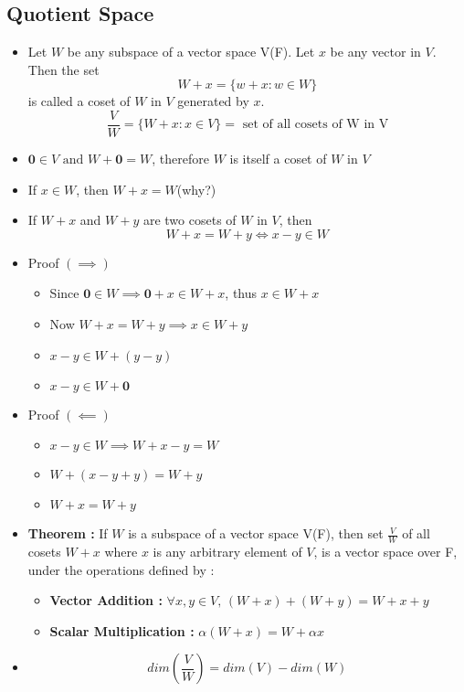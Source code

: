 \documentclass[twoside]{article}
\begin{document}
	\subsection{Quotient Space}
	\begin{itemize}
		\item Let $W$ be any subspace of a vector space V(F). Let $x$ be any vector in $V$. Then the set 
		\[W + x = \{w+x : w \in W\}\]
		is called a coset of $W$ in $V$ generated by $x$.
		\[ \frac{V}{W} = \{W + x : x \in V\} = \text{ set of all cosets of W in V} \]
		\item $\mathbf{0} \in V \text{ and } W + \mathbf{0} = W$, therefore $W$ is itself a coset of $W$ in $V$
		\item If $x \in W$, then $W + x = W$(why?)
		\item If $W + x$ and $W + y$ are two cosets of $W$ in $V$, then 
		\[W + x = W + y \iff x - y \in W\]
		\item Proof $(\implies)$
		\begin{itemize}
			\item Since $\mathbf{0} \in W \implies \mathbf{0} + x \in W + x$, thus $x \in W + x$
			\item Now $W + x = W + y \implies x \in W + y$
			\item $x - y  \in W + (y-y)$
			\item $x - y \in W + \mathbf{0}$
		\end{itemize}
		\item Proof $(\impliedby)$
		\begin{itemize}
			\item $x - y \in W \implies W + x -y = W$
			\item $W + (x -y + y) = W + y$
			\item $W + x = W + y$
		\end{itemize}
		\item {\bf Theorem :} If $W$ is a subspace of a vector space V(F), then set $\frac{V}{W}$ of all cosets $W + x$ where $x$ is any arbitrary element of $V$, is a vector space over F, under the operations defined by : 
		\begin{itemize}
			\item {\bf Vector Addition : } $\forall x,y \in V \text{, } (W + x) + (W + y) = W + x + y$
			\item {\bf Scalar Multiplication : } $\alpha (W + x) = W + \alpha x$
		\end{itemize}
		\item 
		\[dim\left(\frac{V}{W}\right) = dim(V) - dim(W)\]
		\begin{itemize}

\end{itemize}
\end{itemize}
\end{document}
